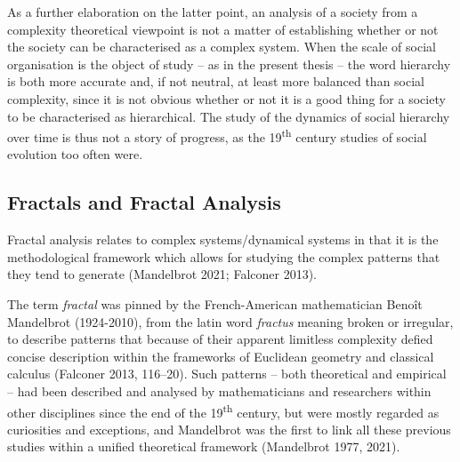 \documentclass[
  12pt,
  a4paper, twoside]{book}
\begin{document}
As a further elaboration on the latter point, an analysis of a society from a complexity theoretical viewpoint is not a matter of establishing whether or not the society can be characterised as a complex system. When the scale of social organisation is the object of study -- as in the present thesis -- the word hierarchy is both more accurate and, if not neutral, at least more balanced than social complexity, since it is not obvious whether or not it is a good thing for a society to be characterised as hierarchical. The study of the dynamics of social hierarchy over time is thus not a story of progress, as the 19\textsuperscript{th} century studies of social evolution too often were.

\hypertarget{fractals-and-fractal-analysis}{%
\subsection{Fractals and Fractal Analysis}\label{fractals-and-fractal-analysis}}

Fractal analysis relates to complex systems/dynamical systems in that it is the methodological framework which allows for studying the complex patterns that they tend to generate (Mandelbrot 2021; Falconer 2013).

The term \emph{fractal} was pinned by the French-American mathematician Benoît Mandelbrot (1924-2010), from the latin word \emph{fractus} meaning broken or irregular, to describe patterns that because of their apparent limitless complexity defied concise description within the frameworks of Euclidean geometry and classical calculus (Falconer 2013, 116--20). Such patterns -- both theoretical and empirical -- had been described and analysed by mathematicians and researchers within other disciplines since the end of the 19\textsuperscript{th} century, but were mostly regarded as curiosities and exceptions, and Mandelbrot was the first to link all these previous studies within a unified theoretical framework (Mandelbrot 1977, 2021).
\end{document}
